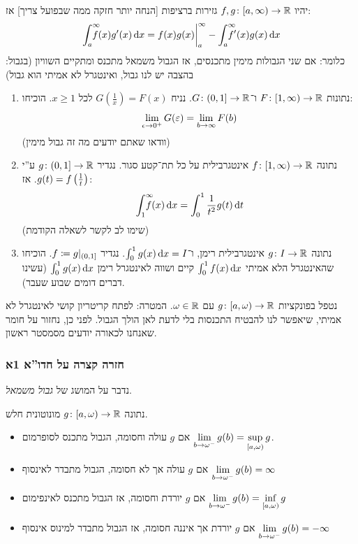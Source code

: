 \documentclass[name=רשימות חדו''א 2א]{../../../tex/classes/noChapterMegasumPreamble}
\newcommand\hopen {[a, \wg)}
\begin{document}
	\begin{Claim}
		יהיו $f, g \colon [a, \infty) \to \mathbb{R}$ גזירות ברציפות [הנחה יותר חזקה ממה שבפועל צריך] אז:
		\[ \int^{\infty}_a \dequad f(x)g'(x)\dx = f(x)g(x)\bigg\vert^{\infty}_a - \int^{\infty}_a \dequad f'(x)g(x) \dx \]
		כלומר:
		אם שני הגבולות מימין מתכנסים, אז הגבול משמאל מתכנס ומתקיים השוויון (בגבול: בהצבה יש לנו גבול, ואינטגרל לא אמיתי הוא גבול)
	\end{Claim}
	\begin{Exercise}[פתיחה]
		\begin{enumerate}
			\item נתונות $F \colon [1, \infty) \to \mathbb{R}$ ו־$G \colon (0, 1] \to \mathbb{R}$. נניח $G(\frac{1}{x}) = F(x)$ לכל $x \ge 1$. הוכיחו:
			\[ \lim_{\epsi \to 0^{+}}G(\eg) = \lim_{b \to \infty}F(b) \]
			(וודאו שאתם יודעים מה זה גבול מימין)
			\item נתונה $f \colon [1, \infty) \to \mathbb{R}$ אינטגרבילית על כל תת־קטע סגור. נגדיר $g \colon (0, 1] \to \mathbb{R}$ ע''י $g(t) = f\left ( \frac{1}{t} \right )$. אז:
			\[ \int^{\infty}_1\!\!\!\!\!\! f(x)\,\mathrm{d}x = \int^{1}_0 \frac{1}{t^{2}}g(t) \,\mathrm{d}t \]
			(שימו לב לקשר לשאלה הקודמת)
			\item נתונה $g \colon I \to \mathbb{R}$ אינטגרבילית רימן, ו־$\int^{1}_0 g(x) \,\mathrm{d}x = I$. נגדיר $f\coloneqq g|_{(0, 1]}$. הוכיחו שהאינטגרל הלא אמיתי $\int^{1}_0f(x)\,\mathrm{d}x$ קיים ושווה לאינטגרל רימן $\int^{1}_0 g(x)\,\mathrm{d}x$ (עשינו דברים דומים שבוע שעבר).
		\end{enumerate}
	\end{Exercise}

	נטפל בפונקציות $g \colon [a, \omega) \to \mathbb{R}$ עם $\omega \in \mathbb{R}$.
	\exe{רשמו הגדרות/טענות/הוכחות המתאימות ל־:
	\begin{itemize}
		\item $g \co [1, \infty) \to \R$ (התנהגות כאשר $x \to \infty$)
		\item $g \co (0, 1) \to \R$ (התנהגות כאשר $x \to 0^{+}$)
	\end{itemize}}
	המטרה: לפתח קריטריון קושי לאינטגרל לא אמיתי, שיאפשר לנו להבטיח התכנסות בלי לדעת לאן הולך הגבול. לפני כן, נחזור על חומר שאנחנו לכאורה יודעים מסמסטר ראשון.
\subsubsection{חזרה קצרה על חדו''א 1א}
	נדבר על המושג של \textit{גבול משמאל}.
	\begin{Theorem}
		נתונה $g \colon [a, \omega) \to \mathbb{R}$ מונוטונית חלש.
		\begin{itemize}
			\item אם $g$ עולה וחסומה, הגבול מתכנס לסופרמום \hfill $\disty \lim_{b \to \wg^{-}} g(b) = \sup_{\hopen} g$.
			\item אם $g$ עולה אך לא חסומה, הגבול מתבדר לאינסוף \hfill $\displaystyle \lim_{b \to \omega^{-}} g(b) = \infty$
			\item אם $g$ יורדת וחסומה, אז הגבול מתכנס לאינפימום \hfill $\disty \lim_{b \to \wg^{-}} g(b) = \inf_{\hopen} g$
			\item אם $g$ יורדת אך איננה חסומה, אז הגבול מתבדר למינוס אינסוף \hfill $\displaystyle \lim_{b \to \omega^{-}} g(b) = -\infty$
		\end{itemize}
	\end{Theorem}
\end{document}
